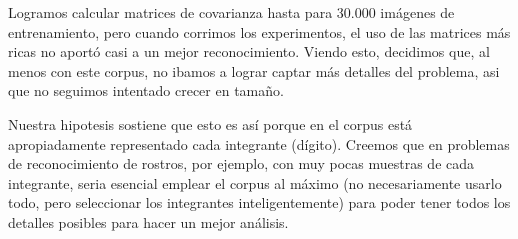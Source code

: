 Logramos calcular matrices de covarianza hasta para 30.000 im\'agenes de entrenamiento, pero cuando
corrimos los experimentos, el uso de las matrices m\'as ricas no aport\'o casi a un mejor reconocimiento.
Viendo esto, decidimos que, al menos con este corpus, no ibamos a lograr captar m\'as detalles del problema,
asi que no seguimos intentado crecer en tama\~no.

Nuestra hipotesis sostiene que esto es as\'i porque en el corpus est\'a apropiadamente
representado cada integrante (d\'igito). Creemos que en problemas de
reconocimiento de rostros, por ejemplo, con muy pocas muestras de cada integrante,
seria esencial emplear el corpus al m\'aximo (no necesariamente usarlo todo, pero seleccionar los
integrantes inteligentemente) para poder tener todos los detalles posibles para hacer un mejor an\'alisis.
